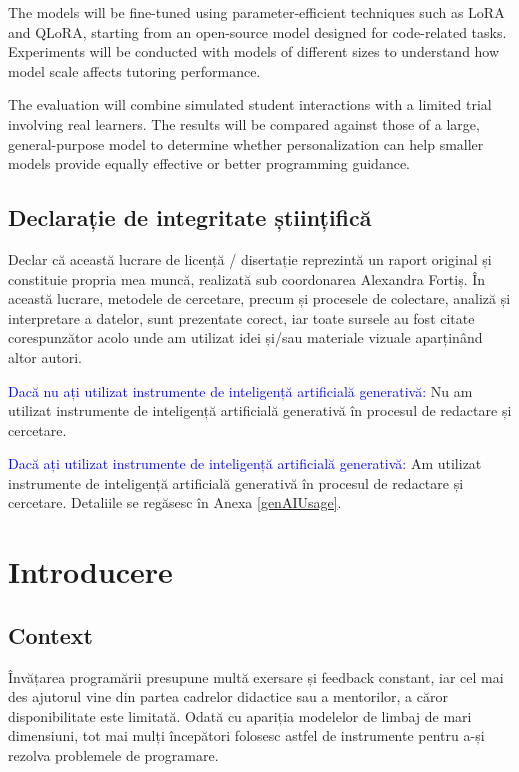\documentclass[12pt,a4paper]{report}
\theoremstyle{definition}
\theoremstyle{remark}
\begin{document}
The models will be fine-tuned using parameter-efficient techniques such as LoRA and QLoRA, starting from an open-source model designed for code-related tasks. Experiments will be conducted with models of different sizes to understand how model scale affects tutoring performance.

The evaluation will combine simulated student interactions with a limited trial involving real learners. The results will be compared against those of a large, general-purpose model to determine whether personalization can help smaller models provide equally effective or better programming guidance.



\newpage

\section*{Declarație de integritate științifică}
Declar că această lucrare de licență / disertație reprezintă un raport original și constituie propria mea muncă, realizată sub coordonarea Alexandra Fortiș. În această lucrare, metodele de cercetare, precum și procesele de colectare, analiză și interpretare a datelor, sunt prezentate corect, iar toate sursele au fost citate corespunzător acolo unde am utilizat idei și/sau materiale vizuale aparținând altor autori.


\textcolor{blue}{Dacă nu ați utilizat instrumente de inteligență artificială generativă:} Nu am utilizat instrumente de inteligență artificială generativă în procesul de redactare și cercetare.

\textcolor{blue}{Dacă ați utilizat instrumente de inteligență artificială generativă:} Am utilizat instrumente de inteligență artificială generativă în procesul de redactare și cercetare. Detaliile se regăsesc în Anexa \ref{genAIUsage}.

\newpage

\tableofcontents
\newpage
\chapter{Introducere}

\section{Context}
Învățarea programării presupune multă exersare și feedback constant, iar cel mai des ajutorul vine din partea cadrelor didactice sau a mentorilor, a căror disponibilitate este limitată. Odată cu apariția modelelor de limbaj de mari dimensiuni, tot mai mulți începători folosesc astfel de instrumente pentru a-și rezolva problemele de programare.
\end{document}
